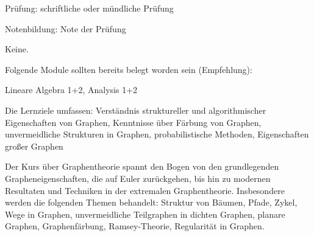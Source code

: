 \begin{course}

\setdoclanguagegerman
{}


\courselevel{}

\coursehead


\label{cour_14353.dp_997}


\begin{styleenv}
\begin{assessment}
Prüfung: schriftliche oder mündliche Prüfung

 

Notenbildung: Note der Prüfung


\end{assessment}

\begin{conditions}Keine.\end{conditions}

\begin{recommendations}Folgende Module sollten bereits belegt worden sein (Empfehlung):

 

Lineare Algebra 1+2, Analysis 1+2

\end{recommendations}
\end{styleenv}

\begin{learningoutcomes}
Die Lernziele umfassen: Verständnis struktureller und algorithmischer Eigenschaften von Graphen, Kenntnisse über Färbung von Graphen, unvermeidliche Strukturen in Graphen, probabilistische Methoden, Eigenschaften großer Graphen


\end{learningoutcomes}

\begin{content}
Der Kurs über Graphentheorie spannt den Bogen von den grundlegenden Grapheneigenschaften, die auf Euler zurückgehen, bis hin zu modernen Resultaten und Techniken in der extremalen Graphentheorie. Insbesondere werden die folgenden Themen behandelt: Struktur von Bäumen, Pfade, Zykel, Wege in Graphen, unvermeidliche Teilgraphen in dichten Graphen, planare Graphen, Graphenfärbung, Ramsey-Theorie, Regularität in Graphen.


\end{content}







\end{course}